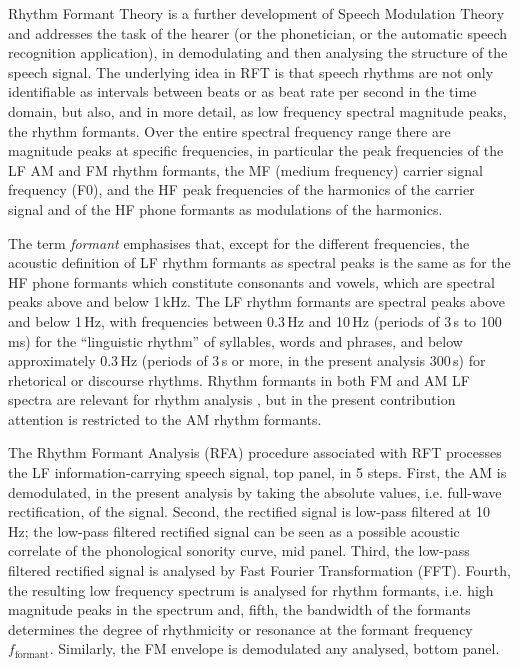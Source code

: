 \documentclass[output=paper,colorlinks,citecolor=brown]{langscibook}
\begin{document}
Rhythm Formant Theory is a further development of Speech Modulation Theory and addresses the task of the hearer (or the phonetician, or the automatic speech recognition application), in demodulating and then analysing the structure of the speech signal. The underlying idea in RFT \citep{gibbonsp2018, gibbonjipa2021, gibbonsp2022} is that speech rhythms are not only identifiable as intervals between beats or as beat rate per second in the time domain, but also, and in more detail, as low frequency spectral magnitude peaks, the rhythm formants. Over the entire spectral frequency range there are magnitude peaks at specific frequencies, in particular the peak frequencies of the LF AM and FM rhythm formants, the MF (medium frequency) carrier signal frequency (F0), and the HF peak frequencies of the harmonics of the carrier signal and of the HF phone formants as modulations of the harmonics.

The term \textit{formant} emphasises that, except for the different frequencies, the acoustic definition of LF rhythm formants as spectral peaks is the same as for the HF phone formants which constitute consonants and vowels, which are spectral peaks above and below 1\,kHz. The LF rhythm formants are spectral peaks above and below 1\,Hz, with frequencies between 0.3\,Hz and 10\,Hz (periods of 3\,s to 100\,ms) for the “linguistic rhythm” \citep{libermanprince1977} of syllables, words and phrases, and below approximately 0.3\,Hz (periods of 3\,s or more, in the present analysis 300\,s) for rhetorical or discourse rhythms. Rhythm formants in both FM and AM LF spectra are relevant for rhythm analysis \citep{gibbonsp2018, gibbonjipa2021, gibbon4urua2022, gibbonsp2022}, but in the present contribution attention is restricted to the AM rhythm formants.

The Rhythm Formant Analysis (RFA) procedure associated with RFT processes the LF information-carrying speech signal,  top panel, in 5 steps. First, the AM is demodulated, in the present analysis by taking the absolute values, i.e. full-wave rectification, of the signal. Second, the rectified signal is low-pass filtered at 10\,Hz; the low-pass filtered rectified signal can be seen as a possible acoustic correlate of the phonological sonority curve,  mid panel. Third, the low-pass filtered rectified signal is analysed by Fast Fourier Transformation (FFT). Fourth, the resulting low frequency spectrum is analysed for rhythm formants, i.e. high magnitude peaks in the spectrum and, fifth, the bandwidth of the formants determines the degree of rhythmicity or resonance at the formant frequency $f_{\text{formant}}$. Similarly, the FM envelope is demodulated any analysed,  bottom panel.
\end{document}
